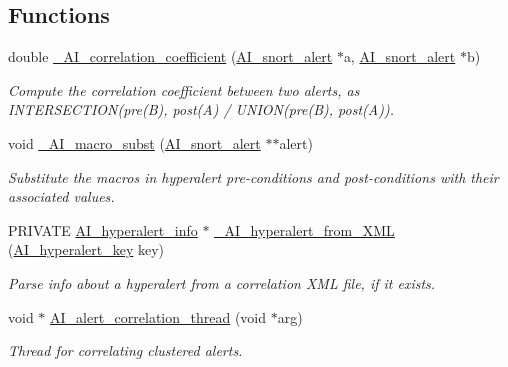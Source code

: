 \subsection*{Functions}
\begin{DoxyCompactItemize}
\item 
double \hyperlink{group__correlation_ga130e82017fc0abcb76b1a7740ae2f4df}{\_\-AI\_\-correlation\_\-coefficient} (\hyperlink{struct__AI__snort__alert}{AI\_\-snort\_\-alert} $\ast$a, \hyperlink{struct__AI__snort__alert}{AI\_\-snort\_\-alert} $\ast$b)
\begin{DoxyCompactList}\small\item\em Compute the correlation coefficient between two alerts, as INTERSECTION(pre(B), post(A) / UNION(pre(B), post(A)). \item\end{DoxyCompactList}\item 
void \hyperlink{group__correlation_ga0d094eae1d014d89a2de21263fa747da}{\_\-AI\_\-macro\_\-subst} (\hyperlink{struct__AI__snort__alert}{AI\_\-snort\_\-alert} $\ast$$\ast$alert)
\begin{DoxyCompactList}\small\item\em Substitute the macros in hyperalert pre-\/conditions and post-\/conditions with their associated values. \item\end{DoxyCompactList}\item 
PRIVATE \hyperlink{structAI__hyperalert__info}{AI\_\-hyperalert\_\-info} $\ast$ \hyperlink{group__correlation_ga929e5c17fdb247a998d83ed6a4ae5a65}{\_\-AI\_\-hyperalert\_\-from\_\-XML} (\hyperlink{structAI__hyperalert__key}{AI\_\-hyperalert\_\-key} key)
\begin{DoxyCompactList}\small\item\em Parse info about a hyperalert from a correlation XML file, if it exists. \item\end{DoxyCompactList}\item 
void $\ast$ \hyperlink{group__correlation_ga939353a4e15de7a8f4145ab986f584be}{AI\_\-alert\_\-correlation\_\-thread} (void $\ast$arg)
\begin{DoxyCompactList}\small\item\em Thread for correlating clustered alerts. \item\end{DoxyCompactList}\end{DoxyCompactItemize}
